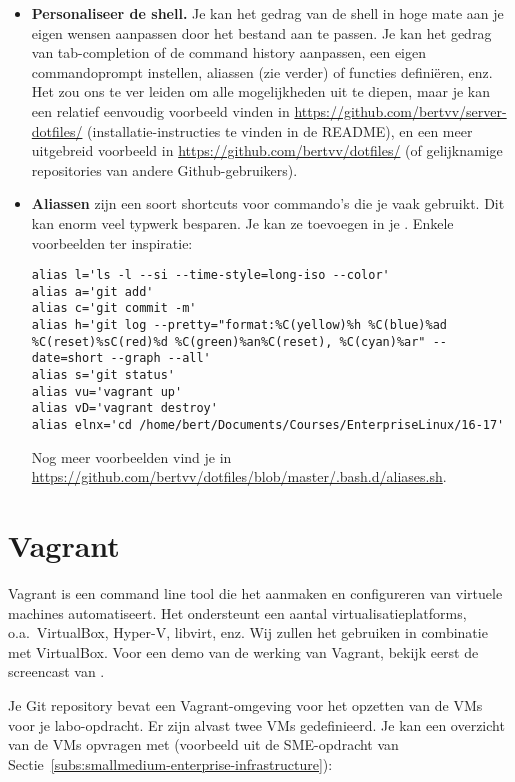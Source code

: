 \begin{itemize}
  \item \textbf{Personaliseer de shell.} Je kan het gedrag van de shell in hoge mate aan je eigen wensen aanpassen door het bestand  aan te passen. Je kan het gedrag van tab-completion of de command history aanpassen, een eigen commandoprompt instellen, aliassen (zie verder) of functies definiëren, enz. Het zou ons te ver leiden om alle mogelijkheden uit te diepen, maar je kan een relatief eenvoudig voorbeeld vinden in \url{https://github.com/bertvv/server-dotfiles/} (installatie-instructies te vinden in de README), en een meer uitgebreid voorbeeld in \url{https://github.com/bertvv/dotfiles/} (of gelijknamige repositories van andere Github-gebruikers).

  \item \textbf{Aliassen} zijn een soort shortcuts voor commando's die je vaak gebruikt. Dit kan enorm veel typwerk besparen. Je kan ze toevoegen in je . Enkele voorbeelden ter inspiratie:

    \begin{verbatim}
alias l='ls -l --si --time-style=long-iso --color'
alias a='git add'
alias c='git commit -m'
alias h='git log --pretty="format:%C(yellow)%h %C(blue)%ad %C(reset)%sC(red)%d %C(green)%an%C(reset), %C(cyan)%ar" --date=short --graph --all'
alias s='git status'
alias vu='vagrant up'
alias vD='vagrant destroy'
alias elnx='cd /home/bert/Documents/Courses/EnterpriseLinux/16-17'
\end{verbatim}

    Nog meer voorbeelden vind je in \url{https://github.com/bertvv/dotfiles/blob/master/.bash.d/aliases.sh}.
\end{itemize}

\section{Vagrant}%
\label{sec:vagrant}

Vagrant is een command line tool die het aanmaken en configureren van virtuele machines automatiseert. Het ondersteunt een aantal virtualisatieplatforms, o.a.~VirtualBox, Hyper-V, libvirt, enz. Wij zullen het gebruiken in combinatie met VirtualBox. Voor een demo van de werking van Vagrant, bekijk eerst de screencast van \textcite{Weissig2014}.

Je Git repository bevat een Vagrant-omgeving voor het opzetten van de VMs voor je labo-opdracht. Er zijn alvast twee VMs gedefinieerd.  Je kan een overzicht van de VMs opvragen met (voorbeeld uit de SME-opdracht van Sectie~\ref{subs:smallmedium-enterprise-infrastructure}):


